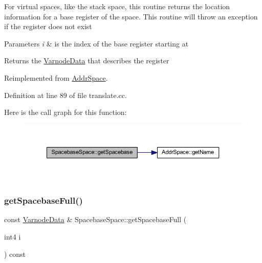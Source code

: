 For virtual spaces, like the stack space, this routine returns the location information for a base register of the space. This routine will throw an exception if the register does not exist 
\begin{DoxyParams}{Parameters}
{\em i} & is the index of the base register starting at \\
\hline
\end{DoxyParams}
\begin{DoxyReturn}{Returns}
the \mbox{\hyperlink{struct_varnode_data}{Varnode\+Data}} that describes the register 
\end{DoxyReturn}


Reimplemented from \mbox{\hyperlink{class_addr_space_ad6b5eb815514577118d9b998447cc4d0}{Addr\+Space}}.



Definition at line 89 of file translate.\+cc.

Here is the call graph for this function\+:
\nopagebreak
\begin{figure}[H]
\begin{center}
\leavevmode
\includegraphics[width=350pt]{class_spacebase_space_af8f5c5b9da9bd74ef022bd0c5c18c2ea_cgraph}
\end{center}
\end{figure}
\mbox{\label{class_spacebase_space_aa6c1b1af9de6666ff998996d647ff44d}} 
\subsubsection{\texorpdfstring{getSpacebaseFull()}{getSpacebaseFull()}}
{\footnotesize\ttfamily const \mbox{\hyperlink{struct_varnode_data}{Varnode\+Data}} \& Spacebase\+Space\+::get\+Spacebase\+Full (\begin{DoxyParamCaption}\item[{int4}]{i }\end{DoxyParamCaption}) const\hspace{0.3cm}{\ttfamily [virtual]}}



